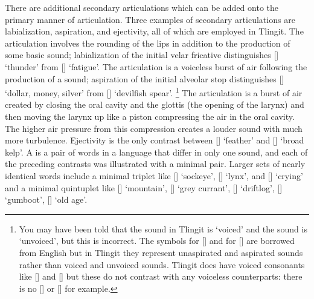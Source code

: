 There are additional secondary articulations which can be added onto the primary manner of articulation.
Three examples of secondary articulations are labialization, aspiration, and ejectivity, all of which are employed in Tlingit.
The  articulation involves the rounding of the lips in addition to the production of some basic sound; labialization of the initial velar fricative distinguishes  [] ‘thunder’ from  [] ‘fatigue’.
The  articulation is a voiceless burst of air following the production of a sound; aspiration of the initial alveolar stop distinguishes  [] ‘dollar, money, silver’ from  [] ‘devilfish spear’.%
\footnote{You may have been told that the sound  in Tlingit is ‘voiced’ and the sound  is ‘unvoiced’, but this is incorrect. The symbols  for [] and  for [] are borrowed from English but in Tlingit they represent unaspirated and aspirated sounds rather than voiced and unvoiced sounds. Tlingit does have voiced consonants like  [] and  [] but these do not contrast with any voiceless counterparts: there is no [\!] or [] for example.}
The  articulation is a burst of air created by closing the oral cavity and the glottis (the opening of the larynx) and then moving the larynx up like a piston compressing the air in the oral cavity.
The higher air pressure from this compression creates a louder sound with much more turbulence.
Ejectivity is the only contrast between  [] ‘feather’ and  [] ‘broad kelp’.
A  is a pair of words in a language that differ in only one sound, and each of the preceding contrasts was illustrated with a minimal pair.
Larger sets of nearly identical words include a minimal triplet like  [] ‘sockeye’,  [] ‘lynx’, and  [] ‘crying’ and a minimal quintuplet like  [] ‘mountain’,  [] ‘grey currant’,  [] ‘driftlog’,  [] ‘gumboot’,  [] ‘old age’.

